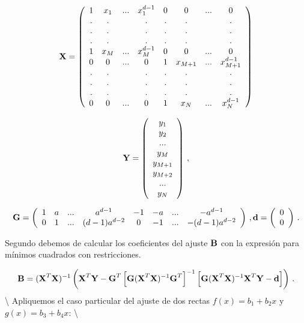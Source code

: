 \documentclass[
]{agujournal2019}
\begin{document}
\[ {\textbf X}=\left(\begin{array}{cccccccc}
  1 & x_1   & .  .  . & x_1^{d-1}  & 0 & 0 & .  .  . & 0 \\
  . & .         &  & .                  & . & . &  & . \\
  . & .         &  & .                  & . & . &  & . \\
  . & .         &  & .                  & . & . &  & . \\
  1 & x_M & .  .  . & x_M^{d-1} & 0 & 0 & .  .  . & 0 \\
  0 & 0       & .  .  . & 0                 & 1 & x_{M+1} & .  .  . & x^{d-1}_{M+1} \\
  . & .         && .                  & . & . &  & . \\
  . & .         & & .                  & . & . &  & . \\
  . & .         &  & .                  & . & . &  & . \\
  0 & 0       & .  .  . & 0                & 1  & x_N & .  .  . & x_N^{d-1} \\
  \end{array}\right)
  \]

\[{\textbf Y}=\left(\begin{array}{c}
    y_1 \\ y_2 \\ . . . \\ y_M \\ y_{M+1}\\ y_{M+2}\\...\\y_N
      \end{array}\right)\,,\]

\[{\textbf G}=\left(\begin{array}{cccccccc}
        1 & a & .  .  .&a^{d-1}&-1&-a& .  .  .&-a^{d-1}\\
        0 & 1 & .  .  .&(d-1)a^{d-2}&0&-1& .  .  .&-(d-1)a^{d-2}\\
          \end{array}\right)\,,
          {\textbf d}=\left(\begin{array}{c}
            0\\
            0\\
              \end{array}\right)\,.\]

Segundo debemos de calcular los coeficientes del ajuste \({\textbf B}\)
con la expresión para mínimos cuadrados con restricciones.

\[{\textbf B}=({\textbf X}^T {\textbf X})^{-1}\left( {\textbf X}^T {\textbf Y} - {\textbf G}^T\left[{\textbf G}({\textbf X}^T{\textbf X})^{-1}{\textbf G}^T \right]^{-1}
           \left[{\textbf G}({\textbf X}^T{\textbf X})^{-1}{\textbf X}^T {\textbf Y}-{\textbf d}\right] \right)\,.\]
\textbackslash{} Apliquemos el caso particular del ajuste de dos rectas
\(f(x)=b_1 + b_2 x\) y \(g(x)=b_3 + b_4 x\): \textbackslash{}
\end{document}
